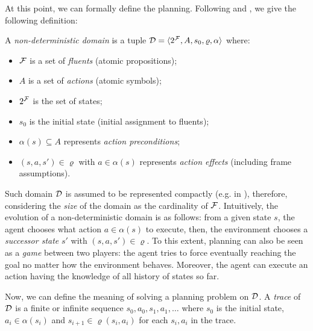 At this point, we can formally define the \FOND planning. Following \citep{ghallab2004automated} and \citep{geffner2013concise}, we give the following definition:
\begin{definition}
A \textit{non-deterministic domain} is a tuple $\mathcal{D} = \langle 2^{\mathcal{F}}, A, s_0, \varrho, \alpha \rangle$ where:
\begin{itemize}
\item $\mathcal{F}$ is a set of \textit{fluents} (atomic propositions);
\item $A$ is a set of \textit{actions} (atomic symbols);
\item $2^{\mathcal{F}}$ is the set of states;
\item $s_0$ is the initial state (initial assignment to fluents);
\item $\alpha(s) \subseteq A$ represents \textit{action preconditions};
\item $(s, a, s') \in \varrho$ with $a \in \alpha(s)$ represents \textit{action effects} (including frame assumptions).
\end{itemize}
\end{definition}
\noindent Such domain $\mathcal{D}$ is assumed to be represented compactly (e.g. in \PDDL), therefore, considering the \textit{size} of the domain as the cardinality of $\mathcal{F}$. Intuitively, the evolution of a non-deterministic domain is as follows: from a given state $s$, the agent chooses what action $a \in \alpha(s)$ to execute, then, the environment chooses a \textit{successor state} $s'$ with $(s,a,s') \in \varrho$. To this extent, planning can also be seen as a \textit{game} between two players: the agent tries to force eventually reaching the goal no matter how the environment behaves.
Moreover, the agent can execute an action having the knowledge of all history of states so far.

Now, we can define the meaning of solving a \FOND planning problem on $\mathcal{D}$. A \textit{trace} of $\mathcal{D}$ is a finite or infinite sequence $s_0,a_0,s_1,a_1, \dots$ where $s_0$ is the initial state, $a_i \in \alpha(s_i)$ and $s_{i+1} \in \varrho(s_i,a_i)$ for each $s_i,a_i$ in the trace.

